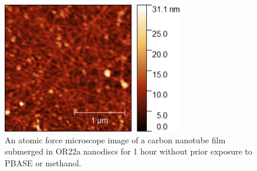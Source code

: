 \documentclass[
  a4paper,
]{scrbook}
\begin{document}
\begin{figure}

{\centering \includegraphics[width=0.7\textwidth,height=\textheight]{figures/ch8/00161_noPBASE.png}

}

\caption{An atomic force microscope image of a carbon nanotube film
submerged in OR22a nanodiscs for 1 hour without prior exposure to PBASE
or methanol.}

\end{figure}
\end{document}
